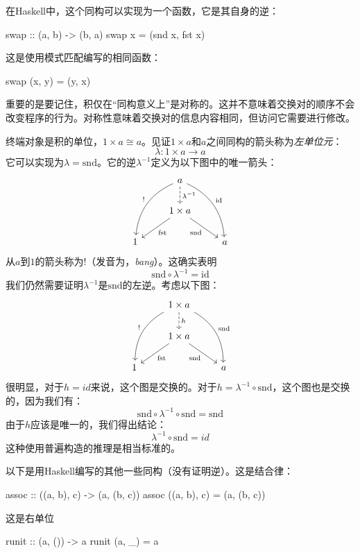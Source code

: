 \documentclass[DaoFP]{subfiles}
\begin{document}
 在Haskell中，这个同构可以实现为一个函数，它是其自身的逆：
 \begin{haskell}
  swap :: (a, b) -> (b, a)
  swap x = (snd x, fst x)
 \end{haskell}
 这是使用模式匹配编写的相同函数：
 \begin{haskell}
  swap (x, y) = (y, x)
 \end{haskell}

 重要的是要记住，积仅在“同构意义上”是对称的。这并不意味着交换对的顺序不会改变程序的行为。对称性意味着交换对的信息内容相同，但访问它需要进行修改。

 终端对象是积的单位，$1 \times a \cong a$。见证$1 \times a$和$a$之间同构的箭头称为\emph{左单位元}：
 \[ \lambda \colon 1 \times a \to a \]
 它可以实现为$\lambda = \text{snd}$。它的逆$\lambda^{-1}$定义为以下图中的唯一箭头：
 \[
  \begin{tikzcd}
   &a
   \arrow[d, dashed, "\lambda^{-1}"]
   \arrow[ddl, bend right, "!"']
   \arrow[ddr, bend left, "\text{id}"]
   \\
   & 1 \times a
   \arrow[dl,  "\text{fst}"]
   \arrow[dr,   "\text{snd}"']
   \\
   1 && a
  \end{tikzcd}
 \]
 从$a$到$1$的箭头称为\index{!}$!$（发音为，\emph{bang}）。这确实表明
 \[\text{snd} \circ \lambda^{-1} = \text{id} \]
 我们仍然需要证明$\lambda^{-1}$是$\text{snd}$的左逆。考虑以下图：
 \[
  \begin{tikzcd}
   &1 \times a
   \arrow[d, dashed, "h"]
   \arrow[ddl, bend right, "!"']
   \arrow[ddr, bend left, "\text{snd}"]
   \\
   & 1 \times a
   \arrow[dl,  "\text{fst}"]
   \arrow[dr,   "\text{snd}"']
   \\
   1 && a
  \end{tikzcd}
 \]
 很明显，对于$h = id$来说，这个图是交换的。对于$h = \lambda^{-1}  \circ  \text{snd}$，这个图也是交换的，因为我们有：
 \[  \text{snd} \circ \lambda^{-1}  \circ  \text{snd} = \text{snd} \]
 由于$h$应该是唯一的，我们得出结论：
 \[ \lambda^{-1}  \circ  \text{snd} = id \]
 这种使用普遍构造的推理是相当标准的。

 以下是用Haskell编写的其他一些同构（没有证明逆）。这是结合律：
 \begin{haskell}
  assoc :: ((a, b), c) -> (a, (b, c))
  assoc ((a, b), c) = (a, (b, c))
 \end{haskell}
 这是右单位
 \begin{haskell}
  runit :: (a, ()) -> a
  runit (a, _) = a
 \end{haskell}
\end{document}
